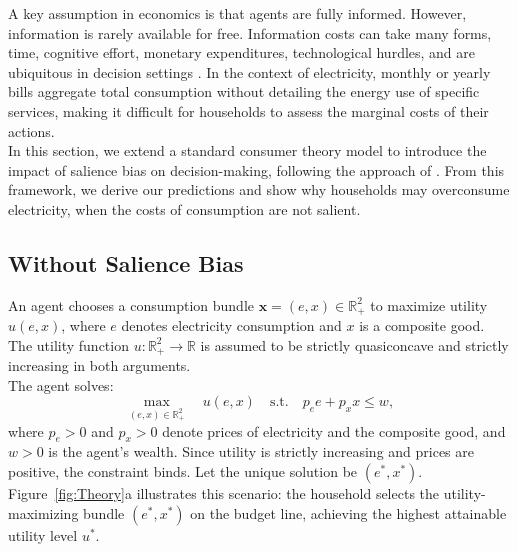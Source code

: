 A key assumption in economics is that agents are fully informed. However, information is rarely available for free. Information costs can take many forms, time, cognitive effort, monetary expenditures, technological hurdles, and are ubiquitous in decision settings \citep{jessoeKnowledgeLessPower2014, tiefenbeckOvercomingSalienceBias2018}. In the context of electricity, monthly or yearly bills aggregate total consumption without detailing the energy use of specific services, making it difficult for households to assess the marginal costs of their actions.  \\

In this section, we extend a standard consumer theory model to introduce the impact of salience bias on decision-making, following the approach of \citet{alcocerSalienceBiasFramework2024}. From this framework, we derive our predictions and show why households may overconsume electricity, when the costs of consumption are not salient.

\subsection{Without Salience Bias}

An agent chooses a consumption bundle \( \mathbf{x} = (e, x) \in \mathbb{R}_+^2 \) to maximize utility \( u(e, x) \), where \( e \) denotes electricity consumption and \( x \) is a composite good. The utility function \( u : \mathbb{R}_+^2 \rightarrow \mathbb{R} \) is assumed to be strictly quasiconcave and strictly increasing in both arguments.\\

The agent solves:
\[
\max_{(e, x) \in \mathbb{R}_+^2} \quad u(e, x) \quad \text{s.t.} \quad p_e e + p_x x \leq w,
\]
where \( p_e > 0 \) and \( p_x > 0 \) denote prices of electricity and the composite good, and \( w > 0 \) is the agent’s wealth. Since utility is strictly increasing and prices are positive, the constraint binds. Let the unique solution be \( (e^*, x^*) \). \\

Figure~\ref{fig:Theory}a illustrates this scenario: the household selects the utility-maximizing bundle \( (e^*, x^*) \) on the budget line, achieving the highest attainable utility level \( u^* \). 


